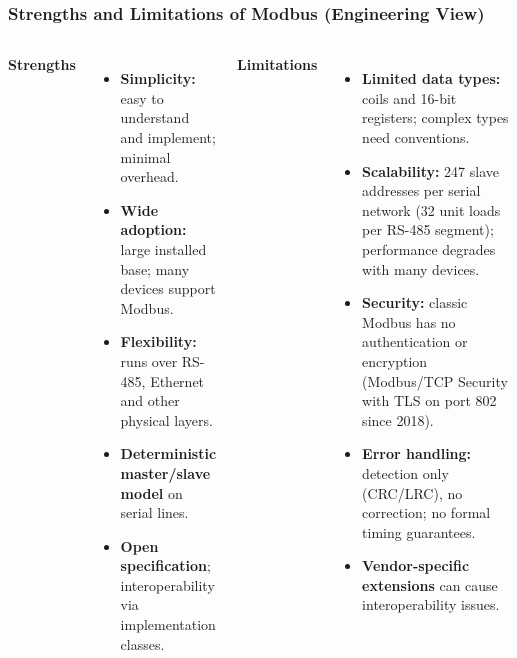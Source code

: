 \begin{frame}
	\frametitle{Strengths and Limitations of Modbus (Engineering View)}
	\small
	\begin{columns}[T,onlytextwidth]
		\textbf{Strengths}
		\begin{itemize}
			\item \textbf{Simplicity:} easy to understand and implement; minimal overhead.
			\item \textbf{Wide adoption:} large installed base; many devices support Modbus.
			\item \textbf{Flexibility:} runs over RS-485, Ethernet and other physical layers.
			\item \textbf{Deterministic master/slave model} on serial lines.
			\item \textbf{Open specification}; interoperability via implementation classes.
		\end{itemize}
		\textbf{Limitations}
		\begin{itemize}
			\item \textbf{Limited data types:} coils and 16-bit registers; complex types need conventions.
			\item \textbf{Scalability:} 247 slave addresses per serial network (32 unit loads per RS-485 segment); performance degrades with many devices.
			\item \textbf{Security:} classic Modbus has no authentication or encryption (Modbus/TCP Security with TLS on port 802 since 2018).
			\item \textbf{Error handling:} detection only (CRC/LRC), no correction; no formal timing guarantees.
			\item \textbf{Vendor-specific extensions} can cause interoperability issues.
		\end{itemize}
	\end{columns}
\end{frame}

